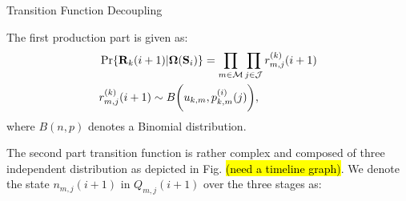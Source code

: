 \documentclass[10pt, conference, letterpaper]{IEEEtran}
\renewcommand{\vec}{\mathbf}
\DeclarePairedDelimiter{\Paren}{\bigg(}{\bigg)}
\newcommand{\apSet}{\mathcal{K}}
\newcommand{\esSet}{\mathcal{M}}
\newcommand{\jSpace}{\mathcal{J}}
\newcommand{\Stat}{\mathbf{S}}
\newcommand{\Policy}{\mathbf{\Omega}}
\begin{document}
    \appendices

    \begin{section}{Transition Function Decoupling}
        \label{trans-decouple}

        The first production part is given as:
        \begin{align*}
            &\Pr\{\vec{R}_k(i+1)|\Policy(\Stat_i)\} = \prod_{m\in\esSet}\prod_{j\in\jSpace} r^{(k)}_{m,j}(i+1)
            \\
            &r^{(k)}_{m,j}(i+1) \sim B\Paren{u_{k,m},p^{(i)}_{k,m}(j)},
        \end{align*}
        where $B(n,p)$ denotes a Binomial distribution.
            
        The second part transition function is rather complex and composed of three independent distribution as depicted in Fig. \hl{(need a timeline graph)}.
        We denote the state $n_{m,j}(i+1)$ in $Q_{m,j}(i+1)$ over the three stages as:

\end{section}
\end{document}
